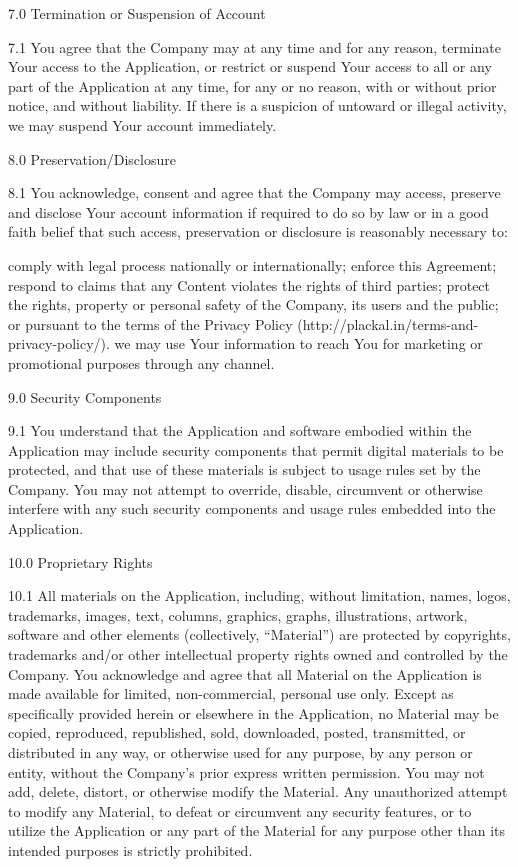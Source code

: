  

7.0        Termination or Suspension of Account

7.1        You agree that the Company may at any time and for any reason, terminate Your access to the Application, or restrict or suspend Your access to all or any part of the Application at any time, for any or no reason, with or without prior notice, and without liability. If there is a suspicion of untoward or illegal activity, we may suspend Your account immediately.

 

8.0        Preservation/Disclosure

8.1        You acknowledge, consent and agree that the Company may access, preserve and disclose Your account information if required to do so by law or in a good faith belief that such access, preservation or disclosure is reasonably necessary to:

comply with legal process nationally or internationally;
enforce this Agreement;
respond to claims that any Content violates the rights of third parties;
protect the rights, property or personal safety of the Company, its users and the public; or
pursuant to the terms of the Privacy Policy (http://plackal.in/terms-and-privacy-policy/).
we may use Your information to reach You for marketing or promotional purposes through any channel.
 

9.0         Security Components

9.1         You understand that the Application and software embodied within the Application may include security components that permit digital materials to be protected, and that use of these materials is subject to usage rules set by the Company. You may not attempt to override, disable, circumvent or otherwise interfere with any such security components and usage rules embedded into the Application.

 

10.0      Proprietary Rights

10.1      All materials on the Application, including, without limitation, names, logos, trademarks, images, text, columns, graphics, graphs, illustrations, artwork, software and other elements (collectively, “Material”) are protected by copyrights, trademarks and/or other intellectual property rights owned and controlled by the Company. You acknowledge and agree that all Material on the Application is made available for limited, non-commercial, personal use only. Except as specifically provided herein or elsewhere in the Application, no Material may be copied, reproduced, republished, sold, downloaded, posted, transmitted, or distributed in any way, or otherwise used for any purpose, by any person or entity, without the Company’s prior express written permission. You may not add, delete, distort, or otherwise modify the Material. Any unauthorized attempt to modify any Material, to defeat or circumvent any security features, or to utilize the Application or any part of the Material for any purpose other than its intended purposes is strictly prohibited.

